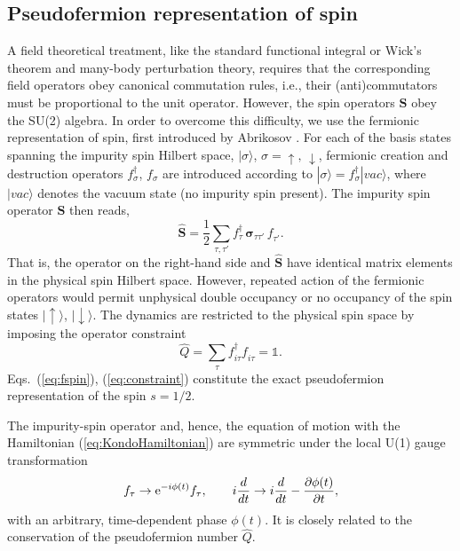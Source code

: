 \documentclass[12pt,twoside]{article}
\newcommand{\ket}[1]{|#1 \rangle}
\newcommand{\phdagger}{{\phantom{\dagger}}}
\newcommand{\bsig}{\boldsymbol\sigma}
\newcommand{\Eqs}[2]{Eqs.~(\ref{#1}), (\ref{#2})}
\begin{document}
\subsection{Pseudofermion representation of spin}
\label{subsec:pseudofermion} 

A field theoretical treatment, like the standard functional integral or
Wick's theorem and many-body perturbation theory, requires that the 
corresponding field operators obey canonical commutation rules, i.e.,
their (anti)commutators must be proportional to the unit operator.
However, the spin operators $\hat{\mathbf{S}}$ obey the SU(2) algebra. 
In order to overcome this difficulty, we use the fermionic representation 
of spin, first introduced by Abrikosov \cite{Abrikosov65}. 
For each of the basis states spanning the impurity spin Hilbert space,  
$\ket{\sigma}$, $\sigma=\uparrow,\,\downarrow$, fermionic creation and 
destruction operators $f_{\sigma}^{\dagger}$, $f_{\sigma}^{\phdagger}$ are
introduced according to 
$\ket{\sigma}=f_{\sigma}^{\dagger}\ket{vac}$, where $\ket{vac}$ denotes the 
vacuum state (no impurity spin present). The impurity spin operator 
$\mathbf{S}$ then reads, 
\begin{equation}
\hat{\mathbf{S}} = \frac{1}{2}\sum_{\tau , \tau '}
f_{\tau}^\dagger\, \bsig_{\tau \tau '}\, f_{\tau '}^{\phdagger}.
\label{eq:fspin}
\end{equation}
That is, the operator on the right-hand side and $\hat{\mathbf{S}}$ have   
identical matrix elements in the physical spin Hilbert space. 
However, repeated action of the fermionic operators would permit 
unphysical double occupancy or no occupancy 
of the spin states $\ket{\uparrow}$, $\ket{\downarrow}$. The dynamics are 
restricted to the physical spin space by imposing the operator constraint
\begin{equation}
\hat Q=\sum_{\tau} f_{i \tau}^\dagger f_{i\tau}^\phdagger = \mathds{1}.
\label{eq:constraint}
\end{equation}
\Eqs{eq:fspin}{eq:constraint} constitute the exact pseudofermion 
representation of the spin $s=1/2$.

The impurity-spin operator and, hence, the equation of motion with the 
Hamiltonian (\ref{eq:KondoHamiltonian}) are symmetric under the local
U(1) gauge transformation 
\begin{equation}
f_{\tau}\rightarrow {\rm e}^{-i\phi (t)} f_{\tau} , \qquad
i\frac{d}{dt} \rightarrow  i\frac{d}{dt} -\frac{\partial \phi(t)}{\partial t}, 
\label{eq:gauge}
\end{equation}
with an arbitrary, time-dependent phase $\phi (t)$. It is closely related to
the conservation of the pseudofermion number $\hat{Q}$. 
\end{document}

